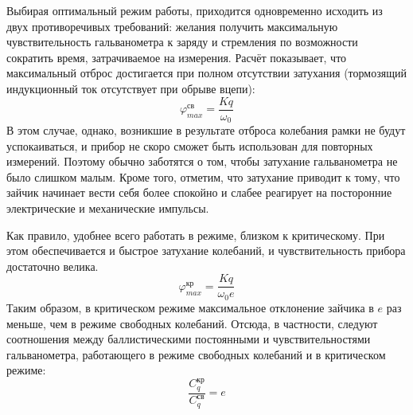 Выбирая оптимальный режим работы, приходится одновременно исходить из двух противоречивых требований: желания получить максимальную чувствительность гальванометра к заряду и стремления по возможности сократить время, затрачиваемое на измерения. Расчёт показывает, что максимальный отброс достигается при полном отсутствии
затухания (тормозящий индукционный ток отсутствует при обрыве вцепи):
\[
    \varphi_{max}^{\text{св}} = \frac{Kq}{\omega_{0}}
\]
В этом случае, однако, возникшие в результате отброса колебания рамки
не будут успокаиваться, и прибор не скоро сможет быть использован для
повторных измерений. Поэтому обычно заботятся о том, чтобы затухание гальванометра не было слишком малым. Кроме того, отметим, что
затухание приводит к тому, что зайчик начинает вести себя более спокойно и слабее реагирует на посторонние электрические и механические импульсы.

Как правило, удобнее всего работать в режиме, близком к критическому. При этом обеспечивается и быстрое затухание колебаний, и чувствительность прибора достаточно велика.
\[
    \varphi_{max}^{\text{кр}} = \frac{Kq}{\omega_{0}e}
\]
Таким образом, в критическом режиме максимальное отклонение зайчика в $e$ раз меньше, чем в режиме свободных колебаний. Отсюда, в частности, следуют соотношения между баллистическими постоянными
и чувствительностями гальванометра, работающего в режиме свободных
колебаний и в критическом режиме:
\[
    \frac{C_{q}^{\text{кр}}}{C_{q}^{\text{св}}} = e
\]

